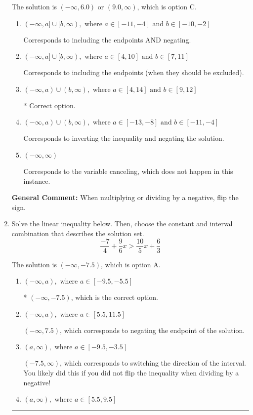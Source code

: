 \documentclass{extbook}[14pt]
\newcommand{\litem}[1]{\item #1

\rule{\textwidth}{0.4pt}}
\begin{document}
\begin{enumerate}
{The solution is \( (-\infty, 6.0) \text{ or } (9.0, \infty) \), which is option C.\begin{enumerate}[label=\Alph*.]
\item \( (-\infty, a] \cup [b, \infty), \text{ where } a \in [-11, -4] \text{ and } b \in [-10, -2] \)

Corresponds to including the endpoints AND negating.
\item \( (-\infty, a] \cup [b, \infty), \text{ where } a \in [4, 10] \text{ and } b \in [7, 11] \)

Corresponds to including the endpoints (when they should be excluded).
\item \( (-\infty, a) \cup (b, \infty), \text{ where } a \in [4, 14] \text{ and } b \in [9, 12] \)

 * Correct option.
\item \( (-\infty, a) \cup (b, \infty), \text{ where } a \in [-13, -8] \text{ and } b \in [-11, -4] \)

Corresponds to inverting the inequality and negating the solution.
\item \( (-\infty, \infty) \)

Corresponds to the variable canceling, which does not happen in this instance.
\end{enumerate}

\textbf{General Comment:} When multiplying or dividing by a negative, flip the sign.
}
\litem{
Solve the linear inequality below. Then, choose the constant and interval combination that describes the solution set.
\[ \frac{-7}{4} + \frac{9}{6} x > \frac{10}{5} x + \frac{6}{3} \]

The solution is \( (-\infty, -7.5) \), which is option A.\begin{enumerate}[label=\Alph*.]
\item \( (-\infty, a), \text{ where } a \in [-9.5, -5.5] \)

* $(-\infty, -7.5)$, which is the correct option.
\item \( (-\infty, a), \text{ where } a \in [5.5, 11.5] \)

 $(-\infty, 7.5)$, which corresponds to negating the endpoint of the solution.
\item \( (a, \infty), \text{ where } a \in [-9.5, -3.5] \)

 $(-7.5, \infty)$, which corresponds to switching the direction of the interval. You likely did this if you did not flip the inequality when dividing by a negative!
\item \( (a, \infty), \text{ where } a \in [5.5, 9.5] \)


\end{enumerate}}
\end{enumerate}
\end{document}
